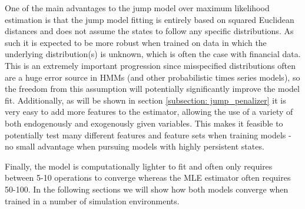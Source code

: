 One of the main advantages to the jump model over maximum likelihood estimation is that the jump model fitting is entirely based on squared Euclidean distances and does not assume the states to follow any specific distributions. As such it is expected to be more robust when trained on data in which the underlying distribution(s) is unknown, which is often the case with financial data. This is an extremely important progression since misspecified distributions often are a huge error source in HMMs (and other probabilistic times series models), so the freedom from this assumption will potentially significantly improve the model fit. Additionally, as will be shown in section \ref{subsection: jump_penalizer} it is very easy to add more features to the estimator, allowing the use of a variety of both endogenously and exogenously given variables. This makes it feasible to potentially test many different features and feature sets when training models - no small advantage when pursuing models with highly persistent states.

Finally, the model is computationally lighter to fit and often only requires between 5-10 operations to converge whereas the MLE estimator often requires 50-100. In the following sections we will show how both models converge when trained in a number of simulation environments.